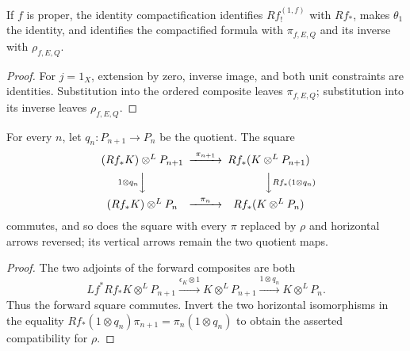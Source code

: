 \begin{lemma}
\label{lemma:weil-pbc-projection-formula-identity-compactification}
\uses{}

If $f$ is proper, the identity compactification identifies $Rf_!^{(1,f)}$
with $Rf_*$, makes $\theta_1$ the identity, and identifies the compactified
formula with $\pi_{f,E,Q}$ and its inverse with $\rho_{f,E,Q}$.
\end{lemma}
\begin{proof}

For $j=1_X$, extension by zero, inverse image, and both unit constraints are
identities.  Substitution into the ordered composite leaves
$\pi_{f,E,Q}$; substitution into its inverse leaves $\rho_{f,E,Q}$.
\end{proof}

\begin{lemma}
\label{lemma:weil-pbc-projection-formula-tower-compatibility}
For every $n$, let $q_n:P_{n+1}\to P_n$ be the quotient.  The square
\[
\begin{CD}
 (Rf_*K)\otimes^LP_{n+1} @>{\pi_{n+1}}>>
 Rf_*(K\otimes^LP_{n+1})\\
 @V{1\otimes q_n}VV @VV{Rf_*(1\otimes q_n)}V\\
 (Rf_*K)\otimes^LP_n @>{\pi_n}>> Rf_*(K\otimes^LP_n)
\end{CD}
\]
commutes, and so does the square with every $\pi$ replaced by $\rho$ and
horizontal arrows reversed; its vertical arrows remain the two quotient
maps.
\end{lemma}
\begin{proof}
The two adjoints of the forward composites are both
\[
 Lf^*Rf_*K\otimes^LP_{n+1}
 \xrightarrow{\epsilon_K\otimes1}K\otimes^LP_{n+1}
 \xrightarrow{1\otimes q_n}K\otimes^LP_n.
\]
Thus the forward square commutes.  Invert the two horizontal isomorphisms in
the equality
$Rf_*(1\otimes q_n)\pi_{n+1}=\pi_n(1\otimes q_n)$ to obtain the asserted
compatibility for $\rho$.
\end{proof}

